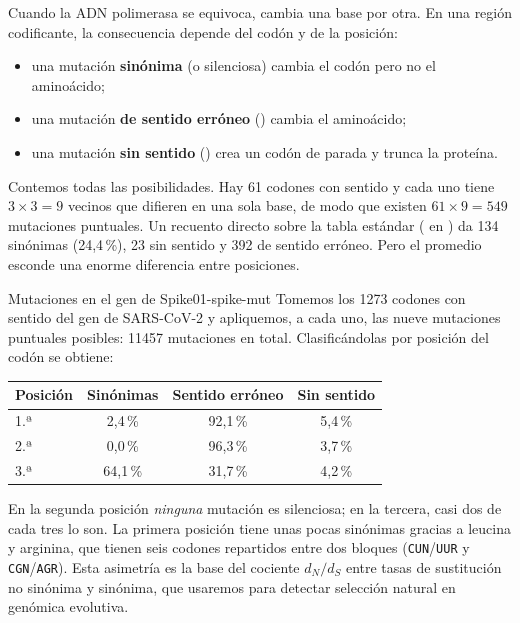 Cuando la ADN polimerasa se equivoca, cambia una base por otra. En una región codificante, la consecuencia depende del codón y de la posición:

\begin{itemize}
  \item una mutación \textbf{sinónima} (o silenciosa) cambia el codón pero no el aminoácido;
  \item una mutación \textbf{de sentido erróneo} () cambia el aminoácido;
  \item una mutación \textbf{sin sentido} () crea un codón de parada y trunca la proteína.
\end{itemize}

Contemos todas las posibilidades. Hay 61 codones con sentido y cada uno tiene $3\times3=9$ vecinos que difieren en una sola base, de modo que existen $61\times9=549$ mutaciones puntuales. Un recuento directo sobre la tabla estándar ( en ) da 134 sinónimas (24,4\,\%), 23 sin sentido y 392 de sentido erróneo. Pero el promedio esconde una enorme diferencia entre posiciones.

\begin{ejemplo}{Mutaciones en el gen de Spike}{01-spike-mut}
Tomemos los \num{1273} codones con sentido del gen  de SARS-CoV-2 y apliquemos, a cada uno, las nueve mutaciones puntuales posibles: \num{11457} mutaciones en total. Clasificándolas por posición del codón se obtiene:
\begin{center}
\small
\begin{tabular}{@{}lccc@{}}
\toprule
\textbf{Posición} & \textbf{Sinónimas} & \textbf{Sentido erróneo} & \textbf{Sin sentido}\\
\midrule
1.ª & 2,4\,\% & 92,1\,\% & 5,4\,\%\\
2.ª & 0,0\,\% & 96,3\,\% & 3,7\,\%\\
3.ª & 64,1\,\% & 31,7\,\% & 4,2\,\%\\
\bottomrule
\end{tabular}
\end{center}
En la segunda posición \emph{ninguna} mutación es silenciosa; en la tercera, casi dos de cada tres lo son. La primera posición tiene unas pocas sinónimas gracias a leucina y arginina, que tienen seis codones repartidos entre dos bloques (\texttt{CUN}/\texttt{UUR} y \texttt{CGN}/\texttt{AGR}). Esta asimetría es la base del cociente $d_N/d_S$ entre tasas de sustitución no sinónima y sinónima, que usaremos para detectar selección natural en genómica evolutiva.
\end{ejemplo}

